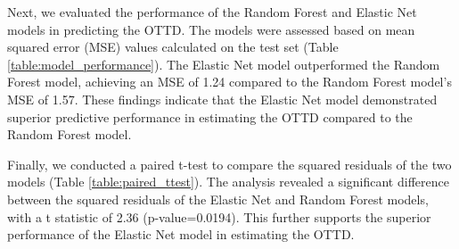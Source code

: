 \documentclass[11pt]{article}
\begin{document}
Next, we evaluated the performance of the Random Forest and Elastic Net models in predicting the OTTD. The models were assessed based on mean squared error (MSE) values calculated on the test set (Table \ref{table:model_performance}). The Elastic Net model outperformed the Random Forest model, achieving an MSE of 1.24 compared to the Random Forest model's MSE of 1.57. These findings indicate that the Elastic Net model demonstrated superior predictive performance in estimating the OTTD compared to the Random Forest model.

\begin{table}[h]
\caption{Performance of Random Forest and Elastic Net models in predicting OTTD}
\label{table:model_performance}
\begin{threeparttable}
\renewcommand{\TPTminimum}{\linewidth}
\begin{tablenotes}
\footnotesize
\item 
\end{tablenotes}
\end{threeparttable}
\end{table}


Finally, we conducted a paired t-test to compare the squared residuals of the two models (Table \ref{table:paired_ttest}). The analysis revealed a significant difference between the squared residuals of the Elastic Net and Random Forest models, with a t statistic of 2.36 (p-value=0.0194). This further supports the superior performance of the Elastic Net model in estimating the OTTD.

\begin{table}[h]
\caption{Paired t-test comparing the squared residuals of the two models}
\label{table:paired_ttest}
\begin{threeparttable}
\renewcommand{\TPTminimum}{\linewidth}
\begin{tablenotes}
\footnotesize
\item 
\end{tablenotes}
\end{threeparttable}
\end{table}
\end{document}
